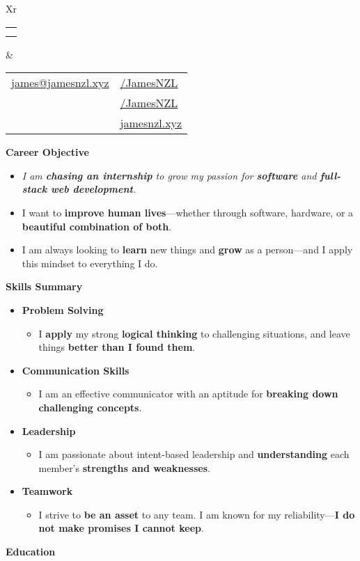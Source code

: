 \documentclass[11pt,a4paper]{article}[leftmargin=*]
\makeatletter
\def \fullname {James Bao}
\def \subtitle {}
\def \emailicon {\faAt}
\def \emaillink {mailto:james@jamesnzl.xyz}
\def \emailtext {james@jamesnzl.xyz}
\def \phoneicon {\faMobile}
\def \phonetext {+64 22 410 1580}
\def \addressicon {\faMapMarker*}
\def \addresstext {Auckland, New Zealand}
\def \linkedinicon {\faLinkedin}
\def \linkedinlink {https://www.linkedin.com/in/jamesnzl/}
\def \linkedintext {/JamesNZL}
\def \githubicon {\faGithub}
\def \githublink {https://github.com/jamesnzl}
\def \githubtext {/JamesNZL}
\def \websiteicon {\faGlobe}
\def \websitelink {https://jamesnzl.xyz/}
\def \websitetext {jamesnzl.xyz}
\def \headertype {\doublecol} %
\def \entryspacing {-0pt}
\def \bulletstylei {\faAngleRight\hspace{-4.5pt}}
\def \email {\emailicon \hspace{3pt}\href{\emaillink}{\emailtext}}
\def \phone {\phoneicon \hspace{3pt}{ \phonetext}}
\def \address {\addressicon \hspace{3pt}{\addresstext}}
\def \linkedin {\linkedinicon \hspace{3pt}\href{\linkedinlink}{\linkedintext}}
\def \github {\githubicon \hspace{3pt}\href{\githublink}{\githubtext}}
\def \website {\websiteicon \hspace{3pt}\href{\websitelink}{\websitetext}}
\renewcommand{\section}[2]{\vspace{5pt}
  \colorbox{secondary}{\color{white}\raggedbottom\normalsize\textbf{{#1}{\hspace{2pt}#2\hspace{4pt}}}}
}
\newcommand{\resumeEntryStart}{\begin{itemize}[leftmargin=2.5mm]}
\newcommand{\resumeEntryEnd}{\end{itemize}\vspace{\entryspacing}}
\newcommand{\resumeItemListStart}{\begin{itemize}[leftmargin=4.5mm]}
\newcommand{\resumeItemListEnd}{\end{itemize}}
\newcommand{\resumeItem}[2][\bulletstylei]{
  \item[\small#1]\small{
    {#2 \vspace{-2pt}}
  }
}
\newcommand{\resumeEntryS}[2]{
  \item[]\small{
    \textbf{\color{primary}#1 }{ #2 \vspace{-4pt}}
  }
}
\newcommand{\resumeEntryE}[1]{
  \item[]\small{
    \resumeIt{\small#1 \vspace{-4pt}}
  }\\
}
\newcommand{\resumeEntryP}[1]{
  \item[]\small{
    #1 \vspace{-4pt}
  }\\
}
\newcommand{\resumeIt}[1]{\textit{\color{accent}#1}}
\newcommand{\resumeBf}[1]{\small\textbf{\color{halfbold}#1}}
\newcommand{\doublecol}[6]{
  \begin{tabularx}{\textwidth}{Xr}
    {
      \begin{tabular}[c]{l}
        \fontsize{35}{45}\selectfont{\color{primary}{{\textbf{\fullname}}}} \\
        {\textit{\subtitle}} %
      \end{tabular}
    } & {
      \begin{tabular}[c]{l@{\hspace{1.5em}}l}
        {\small#4} & {\small#1} \\
        {\small#5} & {\small#2} \\
        {\small#6} & {\small#3}
      \end{tabular}
    }
  \end{tabularx}
}
\newcommand{\singlecol}[6]{
  \begin{tabularx}{\textwidth}{Xr}
    {
      \begin{tabular}[b]{l}
        \fontsize{35}{45}\selectfont{\color{primary}{{\textbf{\fullname}}}} \\
        {\textit{\subtitle}} %
      \end{tabular}
    } & {
      \begin{tabular}[c]{l}
        {\small#1} \\
        {\small#2} \\
        {\small#3} \\
        {\small#4} \\
        {\small#5} \\
        {\small#6}
      \end{tabular}
    }
  \end{tabularx}
}
\makeatother
\begin{document}

\headertype{\linkedin}{\github}{\website}{\email}{\phone}{\address} %
\vspace{-10pt} %


\section{\faCrosshairs}{Career Objective}

\resumeEntryStart
\resumeEntryE{I am \resumeBf{chasing an internship} to grow my passion for \resumeBf{software} and \resumeBf{full-stack web development}.}

\resumeEntryP{I want to \resumeBf{improve human lives}---whether through software, hardware, or a \resumeBf{beautiful combination of both}.}

\resumeEntryP{I am always looking to \resumeBf{learn} new things and \resumeBf{grow} as a person—and I apply this mindset to everything I do.}
\resumeEntryEnd


\section{\faAngleDoubleUp}{Skills Summary}

\resumeEntryStart
\resumeEntryS{Problem Solving}{}
\resumeItemListStart
\resumeItem{
  I \resumeBf{apply} my strong \resumeBf{logical thinking} to challenging situations, and leave things \resumeBf{better than I found them}.
}
\resumeItemListEnd

\resumeEntryS{Communication Skills}{}
\resumeItemListStart
\resumeItem{
  I am an effective communicator with an aptitude for \resumeBf{breaking down challenging concepts}.
}
\resumeItemListEnd

\resumeEntryS{Leadership}{}
\resumeItemListStart
\resumeItem{
  I am passionate about intent-based leadership and \resumeBf{understanding} each member's \resumeBf{strengths and weaknesses}.
}
\resumeItemListEnd

\resumeEntryS{Teamwork}{}
\resumeItemListStart
\resumeItem{
  I strive to \resumeBf{be an asset} to any team. I am known for my reliability---\resumeBf{I do not make promises I cannot keep}.
}
\resumeItemListEnd
\resumeEntryEnd

\section{\faGraduationCap}{Education}
\end{document}
